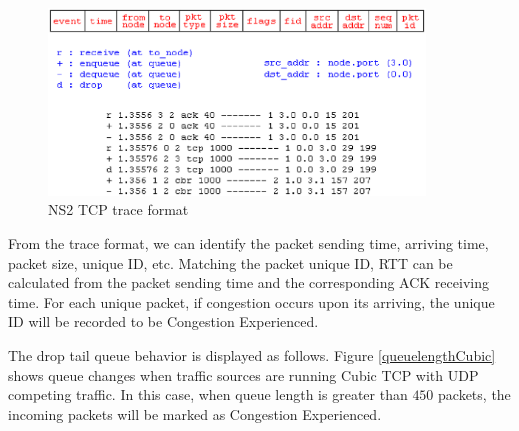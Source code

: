 \begin{figure}
\centering
\includegraphics[width=10cm]{format.eps}
\caption{NS2 TCP trace format}
\label{NS2Format}
\end{figure}
From the trace format, we can identify the packet sending time, arriving time, packet size, unique ID, etc. Matching the packet unique ID, RTT can be calculated from the packet sending time and the corresponding ACK receiving time. For each unique packet, if congestion occurs upon its arriving, the unique ID will be recorded to be Congestion Experienced.

\par The drop tail queue behavior is displayed as follows.
Figure \ref{queuelengthCubic} shows queue changes when traffic sources are running Cubic TCP with UDP competing traffic. 
In this case, when queue length is greater than $450$ packets, the incoming packets will be marked as Congestion Experienced.


